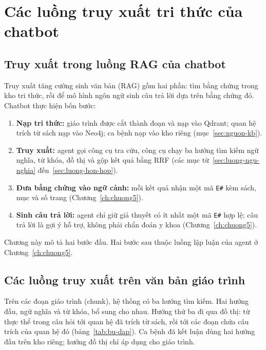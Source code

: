 \section{Các luồng truy xuất tri thức của chatbot}
\label{sec:luong-truy-xuat}

\subsection{Truy xuất trong luồng RAG của chatbot}
\label{sec:rag-tong-quan}

Truy xuất tăng cường sinh văn bản (RAG) gồm hai phần: tìm bằng chứng trong kho tri thức, rồi để mô hình ngôn ngữ sinh câu trả lời dựa trên bằng chứng đó. Chatbot thực hiện bốn bước:
\begin{enumerate}
  \item \textbf{Nạp tri thức:} giáo trình được cắt thành đoạn và nạp vào Qdrant; quan hệ trích từ sách nạp vào Neo4j; ca bệnh nạp vào kho riêng (mục~\ref{sec:nguon-kb}).
  \item \textbf{Truy xuất:} agent gọi công cụ tra cứu, công cụ chạy ba hướng tìm kiếm ngữ nghĩa, từ khóa, đồ thị và gộp kết quả bằng RRF (các mục từ~\ref{sec:luong-ngu-nghia} đến~\ref{sec:luong-hon-hop}).
  \item \textbf{Đưa bằng chứng vào ngữ cảnh:} mỗi kết quả nhận một mã \texttt{E\#} kèm sách, mục và số trang (Chương~\ref{ch:chuong5}).
  \item \textbf{Sinh câu trả lời:} agent chỉ giữ giả thuyết có ít nhất một mã \texttt{E\#} hợp lệ; câu trả lời là gợi ý hỗ trợ, không phải chẩn đoán y khoa (Chương~\ref{ch:chuong5}).
\end{enumerate}
Chương này mô tả hai bước đầu. Hai bước sau thuộc luồng lập luận của agent ở Chương~\ref{ch:chuong5}.

\subsection{Các luồng truy xuất trên văn bản giáo trình}

Trên các đoạn giáo trình (chunk), hệ thống có ba hướng tìm kiếm. Hai hướng đầu, ngữ nghĩa và từ khóa, bổ sung cho nhau. Hướng thứ ba đi qua đồ thị: từ thực thể trong câu hỏi tới quan hệ đã trích từ sách, rồi tới các đoạn chứa câu trích của quan hệ đó (bảng~\ref{tab:bu-dap}). Ca bệnh đã kết luận dùng hai hướng đầu trên kho riêng; hướng đồ thị chỉ áp dụng cho giáo trình.

